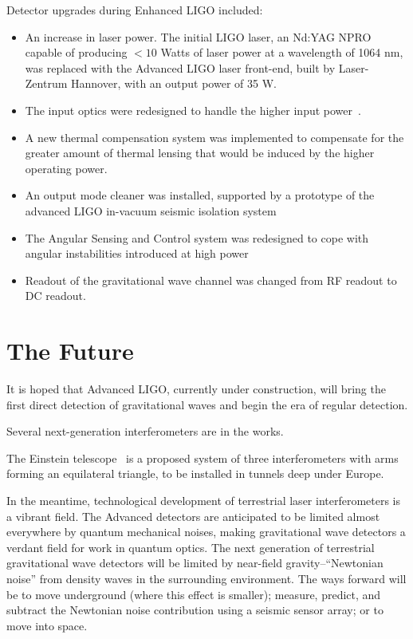 Detector upgrades during Enhanced LIGO included:
\begin{itemize}
\item An increase in laser power.  The initial LIGO laser, an Nd:YAG
  NPRO capable of producing $< 10$ Watts of laser power at a
  wavelength of 1064 nm, was replaced with the Advanced LIGO laser
  front-end, built by Laser-Zentrum Hannover, with an output power of 35 W.
\item The input optics were redesigned to handle the higher input
  power~\cite{DooleyCharacterization,Quetschke2008ElectroOptic}.  
\item A new thermal compensation system was implemented to compensate
  for the greater amount of thermal lensing that would be induced by
  the higher operating power.
\item An output mode cleaner was installed, supported by a prototype
  of the advanced LIGO in-vacuum seismic isolation system~\cite{KisselThesis}
\item The Angular Sensing and Control system was redesigned to cope
  with angular instabilities introduced at high
  power~\cite{Sidles2006Optical,DooleyAngular}
\item Readout of the gravitational wave channel was changed from RF
  readout to DC readout.
\end{itemize}

\section{The Future}

It is hoped that Advanced LIGO, currently under construction, will
bring the first direct detection of gravitational waves and begin the
era of regular detection.

Several next-generation interferometers are in the works. 

The Einstein telescope~\cite{EinsteinTelescopeDesignStudy2011} is a
proposed system of three interferometers with arms forming an
equilateral triangle, to be installed in tunnels deep under Europe.

In the meantime, technological development of terrestrial laser
interferometers is a vibrant field.  The Advanced detectors are
anticipated to be limited almost everywhere by quantum mechanical
noises, making gravitational wave detectors a verdant field for work
in quantum optics.  The next generation of terrestrial gravitational
wave detectors will be limited by near-field gravity--``Newtonian
noise'' from density waves in the surrounding environment.  The ways
forward will be to move underground (where this effect is smaller);
measure, predict, and subtract the Newtonian noise contribution using
a seismic sensor array; or to move into space.

